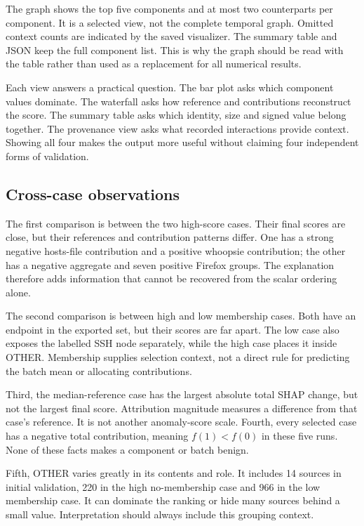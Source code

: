 \documentclass[11pt,a4paper]{article}
\begin{document}
The graph shows the top five components and at most two counterparts per
component. It is a selected view, not the complete temporal graph. Omitted
context counts are indicated by the saved visualizer. The summary table and
JSON keep the full component list. This is why the graph should be read with
the table rather than used as a replacement for all numerical results.

Each view answers a practical question. The bar plot asks which component
values dominate. The waterfall asks how reference and contributions reconstruct
the score. The summary table asks which identity, size and signed value belong
together. The provenance view asks what recorded interactions provide context.
Showing all four makes the output more useful without claiming four independent
forms of validation.

\subsection{Cross-case observations}
The first comparison is between the two high-score cases. Their final scores
are close, but their references and contribution patterns differ. One has a
strong negative hosts-file contribution and a positive whoopsie contribution;
the other has a negative aggregate and seven positive Firefox groups. The
explanation therefore adds information that cannot be recovered from the
scalar ordering alone.

The second comparison is between high and low membership cases. Both have an
endpoint in the exported set, but their scores are far apart. The low case
also exposes the labelled SSH node separately, while the high case places it
inside OTHER. Membership supplies selection context, not a direct rule for
predicting the batch mean or allocating contributions.

Third, the median-reference case has the largest absolute total SHAP change,
but not the largest final score. Attribution magnitude measures a difference
from that case's reference. It is not another anomaly-score scale. Fourth,
every selected case has a negative total contribution, meaning $f(1)<f(0)$
in these five runs. None of these facts makes a component or batch benign.

Fifth, OTHER varies greatly in its contents and role. It includes 14 sources
in initial validation, 220 in the high no-membership case and 966 in the low
membership case. It can dominate the ranking or hide many sources behind a
small value. Interpretation should always include this grouping context.
\end{document}
